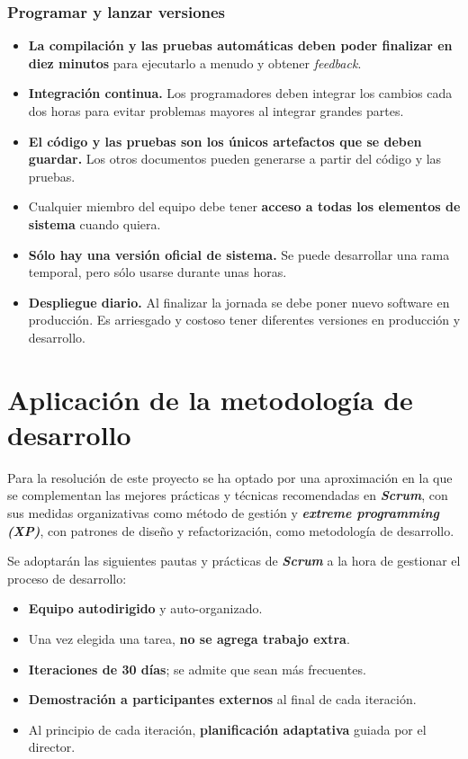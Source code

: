 \subsubsection{Programar y lanzar versiones}
\begin{itemize}
\item \textbf{La compilación y las pruebas automáticas deben poder finalizar en diez minutos} para ejecutarlo a menudo y obtener \textit{feedback}. 
\item \textbf{Integración continua.} Los programadores deben integrar los cambios cada dos horas para evitar problemas mayores al integrar grandes partes.
\item \textbf{El código y las pruebas son los únicos artefactos que se deben guardar.} Los otros documentos pueden generarse a partir del código y las pruebas.
\item Cualquier miembro del equipo debe tener \textbf{acceso a todas los elementos de sistema} cuando quiera. 
\item \textbf{Sólo hay una versión oficial de sistema.} Se puede desarrollar una rama temporal, pero sólo usarse durante unas horas.
\item \textbf{Despliegue diario.} Al finalizar la jornada se debe poner nuevo software en producción. Es arriesgado y costoso tener diferentes versiones en producción y desarrollo.
\end{itemize}


\section{Aplicación de la metodología de desarrollo}

Para la resolución de este proyecto se ha optado por una aproximación en la que se complementan las mejores prácticas y técnicas recomendadas en \textbf{\textit{Scrum}}, con sus medidas organizativas como método de gestión y \textbf{\textit{extreme programming (XP)}}, con patrones de diseño y refactorización, como metodología de desarrollo.

Se adoptarán las siguientes pautas y prácticas de \textbf{\textit{Scrum}} a la hora de gestionar el proceso de desarrollo:
\begin{itemize}
\item \textbf{Equipo autodirigido} y auto-organizado. 
\item Una vez elegida una tarea, \textbf{no se agrega trabajo extra}. %
\item \textbf{Iteraciones de 30 días}; se admite que sean más frecuentes.
\item \textbf{Demostración a participantes externos} al final de cada iteración. 
\item Al principio de cada iteración, \textbf{planificación adaptativa} guiada por el director.
\end{itemize}

